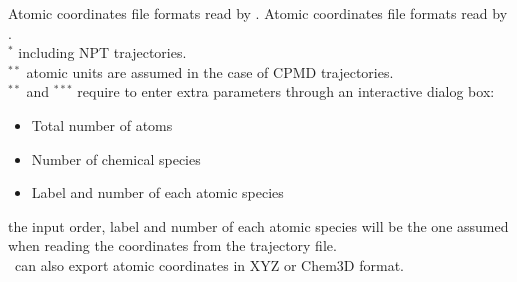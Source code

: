 {Atomic coordinates file formats read by \atomes.}
{Atomic coordinates file formats read by \atomes.}
\\$^{*}$ including NPT trajectories. \\
$^{**}$ atomic units are assumed in the case of CPMD trajectories. \\
$^{**}$ and $^{***}$ require to enter extra parameters through an interactive dialog box: 
\begin{itemize}
\item Total number of atoms
\item Number of chemical species
\item Label and number of each atomic species
\end{itemize}
the input order, label and number of each atomic species will be the one assumed when reading the coordinates from the trajectory file. \\
\atomes\ can also export atomic coordinates in XYZ or Chem3D format.
